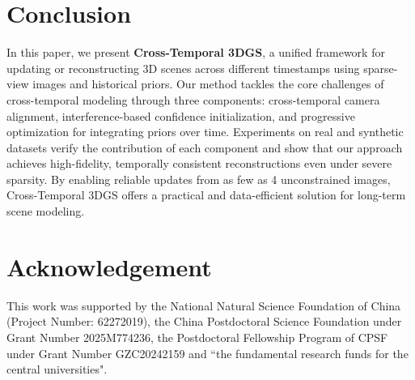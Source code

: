 \documentclass[letterpaper]{article} %
\begin{document}
\section{Conclusion}
In this paper, we present \textbf{Cross-Temporal 3DGS}, a unified framework for updating or reconstructing 3D scenes across different timestamps using sparse-view images and historical priors. Our method tackles the core challenges of cross-temporal modeling through three components: cross-temporal camera alignment, interference-based confidence initialization, and progressive optimization for integrating priors over time. Experiments on real and synthetic datasets verify the contribution of each component and show that our approach achieves high-fidelity, temporally consistent reconstructions even under severe sparsity. By enabling reliable updates from as few as 4 unconstrained images, Cross-Temporal 3DGS offers a practical and data-efficient solution for long-term scene modeling.


\section{Acknowledgement}
This work was supported by the National Natural Science Foundation of China (Project Number: 62272019), the China Postdoctoral Science Foundation under Grant Number 2025M774236, the Postdoctoral Fellowship Program of CPSF under Grant Number GZC20242159 and ``the fundamental research funds for the central universities".


\end{document}
